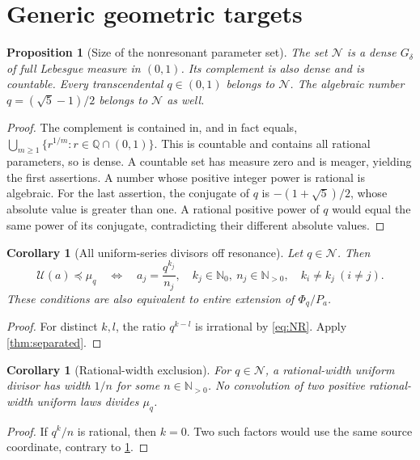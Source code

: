\documentclass[11pt,letterpaper]{article}
\newtheorem{proposition}[theorem]{Proposition}
\newtheorem{corollary}[theorem]{Corollary}
\theoremstyle{definition}
\theoremstyle{remark}
\newcommand{\N}{\mathbb N_0}
\newcommand{\Np}{\mathbb N_{>0}}
\newcommand{\Q}{\mathbb Q}
\newcommand{\Un}{\mathcal U}
\newcommand{\NR}{\mathcal N}
\numberwithin{equation}{section}
\begin{document}
\section{Generic geometric targets}\label{sec:generic}
\begin{proposition}[Size of the nonresonant parameter set]\label{prop:full}
The set $\NR$ is a dense $G_\delta$ of full Lebesgue measure in $(0,1)$. Its complement is also dense and is countable. Every transcendental $q\in(0,1)$ belongs to $\NR$. The algebraic number $q=(\sqrt5-1)/2$ belongs to $\NR$ as well.
\end{proposition}
\begin{proof}
The complement is contained in, and in fact equals,
$\bigcup_{m\ge1}\{r^{1/m}:r\in\Q\cap(0,1)\}$. This is countable and contains all rational parameters, so is dense. A countable set has measure zero and is meager, yielding the first assertions. A number whose positive integer power is rational is algebraic. For the last assertion, the conjugate of $q$ is $-(1+\sqrt5)/2$, whose absolute value is greater than one. A rational positive power of $q$ would equal the same power of its conjugate, contradicting their different absolute values.
\end{proof}

\begin{corollary}[All uniform-series divisors off resonance]\label{cor:generic}
Let $q\in\NR$. Then
\begin{equation}\label{eq:generic}
 \Un(a)\preceq\mu_q
 \quad\Longleftrightarrow\quad
 a_j=\frac{q^{k_j}}{n_j},\quad k_j\in\N,\ n_j\in\Np,
 \quad k_i\ne k_j\ (i\ne j).
\end{equation}
These conditions are also equivalent to entire extension of $\Phi_q/P_a$.
\end{corollary}
\begin{proof}
For distinct $k,l$, the ratio $q^{k-l}$ is irrational by \eqref{eq:NR}. Apply \cref{thm:separated}.
\end{proof}

\begin{corollary}[Rational-width exclusion]\label{cor:rational}
For $q\in\NR$, a rational-width uniform divisor has width $1/n$ for some $n\in\Np$. No convolution of two positive rational-width uniform laws divides $\mu_q$.
\end{corollary}
\begin{proof}
If $q^k/n$ is rational, then $k=0$. Two such factors would use the same source coordinate, contrary to \cref{cor:generic}.
\end{proof}
\end{document}
